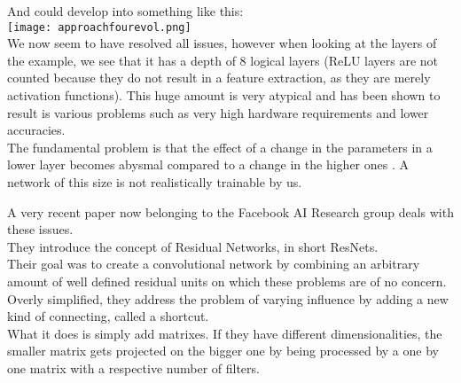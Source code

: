 And could develop into something like this:\\
\texttt{[image: approachfourevol.png]}\\

We now seem to have resolved all issues, however when looking at the layers of the example, we see that it has a depth of 8 logical layers (ReLU layers are not counted because they do not result in a feature extraction, as they are merely activation functions). This huge amount is very atypical and has been shown to result is various problems such as very high hardware requirements and lower accuracies\cite{Simonyan2015}.\\
The fundamental problem is that the effect of a change in the parameters in a lower layer becomes abysmal compared to a change in the higher ones \cite{Simonyan2015} \cite{Hochreiter1991}.
A network of this size is not realistically trainable by us. 

A very recent paper now belonging to the Facebook AI Research group deals with these issues.\\
They introduce the concept of Residual Networks, in short ResNets. \cite{KaimingHe2015}\\
Their goal was to create a convolutional network by combining an arbitrary amount of well defined residual units on which these problems are of no concern.
Overly simplified, they address the problem of varying influence by adding a new kind of connecting, called a shortcut.\\

What it does is simply add matrixes. If they have different dimensionalities, the smaller matrix gets projected on the bigger one by being processed by a one by one matrix with a respective number of filters.\\

